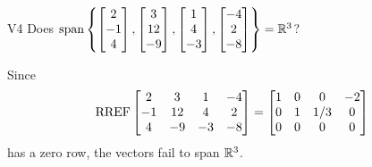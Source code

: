 \begin{problem}{V4}
Does
\(
  \operatorname{span}\left\{
    \begin{bmatrix} 2 \\ -1 \\ 4 \end{bmatrix},
    \begin{bmatrix} 3 \\ 12 \\ -9 \end{bmatrix},
    \begin{bmatrix} 1 \\ 4 \\ -3 \end{bmatrix},
    \begin{bmatrix} -4 \\ 2 \\ -8 \end{bmatrix}
  \right\} = \mathbb{R}^3
\)?
\end{problem}
\begin{solution}
Since
\[
  \operatorname{RREF}\begin{bmatrix}
    2 & 3 & 1 & -4 \\
    -1 & 12 & 4 & 2 \\
    4 & -9 & -3 & -8
  \end{bmatrix} =
  \begin{bmatrix}
    1 & 0 & 0 & -2 \\
    0 & 1 & 1/3 & 0 \\
    0 & 0 & 0 & 0
  \end{bmatrix}
\]
has a zero row, the vectors fail to span \(\mathbb{R}^3\).
\end{solution}

